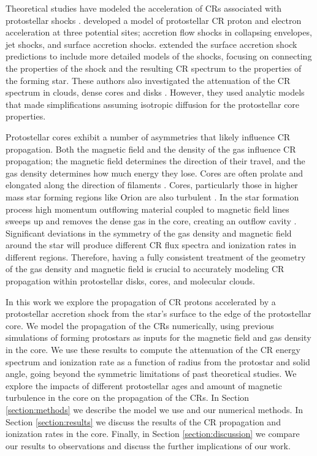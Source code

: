 \documentclass[twocolumn]{aastex63}
\begin{document}
Theoretical studies have modeled the acceleration of CRs associated with protostellar shocks \citep{padovani_2015_protostars, padovani_2016_protostars}.  \cite{padovani_2016_protostars} developed a model of protostellar CR proton and electron acceleration at three potential sites; accretion flow shocks in collapsing envelopes, jet shocks, and surface accretion shocks.  \cite{gaches_2018_exploration} extended the surface accretion shock predictions to include more detailed models of the shocks, focusing on connecting the properties of the shock and the resulting CR spectrum to the properties of the forming star. These authors also investigated the attenuation of the CR spectrum in clouds, dense cores and disks \citep{padovani_2016_protostars, padovani_2018_disks, gaches_2018_exploration, offner_2019_disks}. However, they used analytic models that made simplifications assuming isotropic diffusion for the protostellar core properties.

Protostellar cores exhibit a number of asymmetries that likely influence CR propagation. Both the magnetic field and the density of the gas influence CR propagation; the magnetic field determines the direction of their travel, and the gas density determines how much energy they lose. Cores are often prolate and elongated along the direction of filaments \citep{myers_1991_cores, nutter_2007_orion}. Cores, particularly those in higher mass star forming regions like Orion are also turbulent \citep{kirk_2017_orion}.
In the star formation process high momentum outflowing material coupled to magnetic field lines sweeps up and removes the dense gas in the core, creating an outflow cavity \citep{bally_2016_outflows}. Significant deviations in the symmetry of the gas density and magnetic field around the star will produce different CR flux spectra and ionization rates in different regions. Therefore, having a fully consistent treatment of the geometry of the gas density and magnetic field is crucial to accurately modeling CR propagation within protostellar disks, cores, and molecular clouds.

In this work we explore the propagation of CR protons accelerated by a protostellar accretion shock from the star's surface to the edge of the protostellar core. We model the propagation of the CRs numerically, using previous simulations of forming protostars as inputs for the magnetic field and gas density in the core. We use these results to compute the attenuation of the CR energy spectrum and ionization rate as a function of radius from the protostar and solid angle, going beyond the symmetric limitations of past theoretical studies. We explore the impacts of different protostellar ages and amount of magnetic turbulence in the core on the propagation of the CRs. In Section \ref{section:methods} we describe the model we use and our numerical methods. In Section \ref{section:results} we discuss the results of the CR propagation and ionization rates in the core. Finally, in Section \ref{section:discussion} we compare our results to observations and discuss the further implications of our work.
\end{document}
